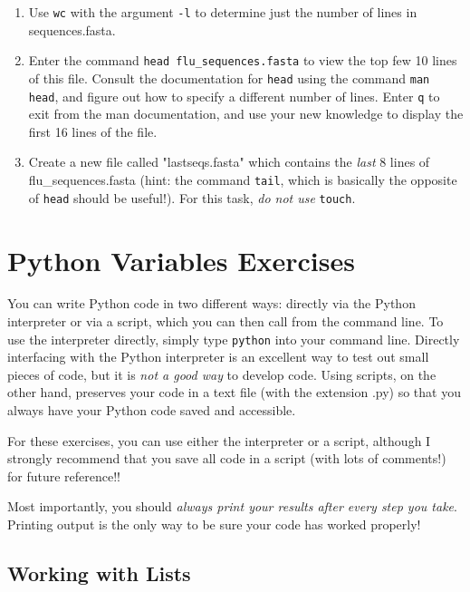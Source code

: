\documentclass{article}[12pt]
\newcommand{\code}[1]{\texttt{#1}}  %
\begin{document}
\begin{enumerate}[itemsep=5ex]
\begin{enumerate}[itemsep=2ex]
		\item Use \code{wc} with the argument \code{-l} to determine just the number of lines in sequences.fasta.
		
		\item Enter the command \code{head flu\_sequences.fasta} to view the top few 10 lines of this file. Consult the documentation for \code{head} using the command \code{man head}, and figure out how to specify a different number of lines. Enter \code{q} to exit from the man documentation, and use your new knowledge to display the first 16 lines of the file.
		 
		\item Create a new file called "lastseqs.fasta" which contains the \emph{last} 8 lines of flu\_sequences.fasta (hint: the command \code{tail}, which is basically the opposite of \code{head} should be useful!). For this task, \emph{do not use} \code{touch}.
	\end{enumerate}
\end{enumerate}
			
\vspace{2.25cm}

\section{Python Variables Exercises}

You can write Python code in two different ways: directly via the Python interpreter or via a script, which you can then call from the command line. To use the interpreter directly, simply type \code{python} into your command line. Directly interfacing with the Python interpreter is an excellent way to test out small pieces of code, but it is \emph{not a good way} to develop code. Using scripts, on the other hand, preserves your code in a text file (with the extension .py) so that you always have your Python code saved and accessible.

For these exercises, you can use either the interpreter or a script, although I strongly recommend that you save all code in a script (with lots of comments!) for future reference!!

Most importantly, you should \emph{always print your results after every step you take}. Printing output is the only way to be sure your code has worked properly!

\vspace{1.5cm}

\subsection{Working with Lists}
\end{document}
